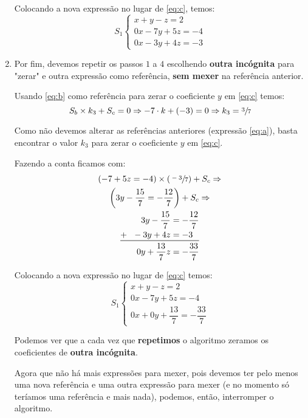 \begin{enumerate}
    Colocando a nova expressão no lugar de \ref{eq:c}, temos:
    $$
    S_1\begin{cases}
    x+y-z=2\\
    0x-7y+5z=-4\\
    0x-3y+4z=-3
    \end{cases}
    $$
    
    \item Por fim, devemos repetir os passos $1$ a $4$ escolhendo \textbf{outra incógnita} para "zerar" e outra expressão como referência, \textbf{sem mexer} na referência anterior.
    
    Usando \ref{eq:b} como referência para zerar o coeficiente $y$ em \ref{eq:c} temos:
    $$
    S_b\times k_3 +S_c=0\Rightarrow -7\cdot k + (-3) =0\Rightarrow k_3= \sfrac{3}{7}
    $$
    
    Como não devemos alterar as referências anteriores (expressão \ref{eq:a}), basta encontrar o valor $k_3$ para zerar o coeficiente $y$ em \ref{eq:c}.
    
    Fazendo a conta ficamos com:
    \begin{gather*}
        (-7+5z=-4) \times \left(\sfrac{-3}{7}\right)+S_c\Rightarrow\\
        \left(3y-\frac{15}{7}=-\frac{12}{7}\right) + S_c\Rightarrow\\
        \begin{aligned}
        3y-\frac{15}{7}&=-\frac{12}{7}\\
        \mathbf{+}~~-3y+4z&=-3\\\midrule
        0y+\frac{13}{7}z&=-\frac{33}{7}
        \end{aligned}
    \end{gather*}

    Colocando a nova expressão no lugar de \ref{eq:c} temos:
    $$
    S_1\begin{cases}
    x+y-z=2\\
    0x-7y+5z=-4\\
    0x+0y+\dfrac{13}{7}=-\dfrac{33}{7}
    \end{cases}
    $$
    
    Podemos ver que a cada vez que \textbf{repetimos} o algoritmo zeramos os coeficientes de \textbf{outra incógnita}.
    
    Agora que não há mais expressões para mexer, pois devemos ter pelo menos uma nova referência e uma outra expressão para mexer (e no momento só teríamos uma referência e mais nada), podemos, então, interromper o algoritmo.


\end{enumerate}